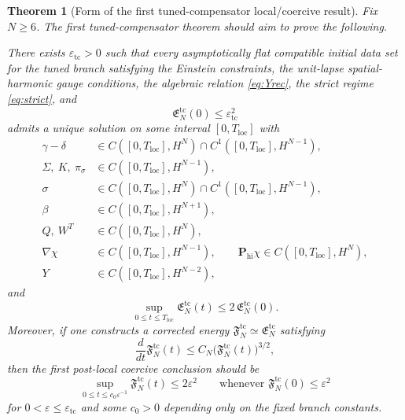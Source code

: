 \documentclass[11pt]{article}
\newtheorem{theorem}{Theorem}
\begin{document}
\begin{theorem}[Form of the first tuned-compensator local/coercive result]
\label{thm:form}
Fix \(N\ge 6\). The first tuned-compensator theorem should aim to prove the following.

There exists \(\varepsilon_{\mathrm{tc}}>0\) such that every asymptotically flat compatible initial data set for the tuned branch satisfying the Einstein constraints, the unit-lapse spatial-harmonic gauge conditions, the algebraic relation \eqref{eq:Yrec}, the strict regime \eqref{eq:strict}, and
\begin{equation}
\mathfrak E_N^{\mathrm{tc}}(0)\le \varepsilon_{\mathrm{tc}}^2
\label{eq:small}
\end{equation}
admits a unique solution on some interval \([0,T_{\mathrm{loc}}]\) with
\begin{align}
\gamma-\delta &\in C([0,T_{\mathrm{loc}}],H^N)\cap C^1([0,T_{\mathrm{loc}}],H^{N-1}),
\label{eq:reggamma}
\\
\Sigma,\ K,\ \pi_\sigma &\in C([0,T_{\mathrm{loc}}],H^{N-1}),
\label{eq:regsigmakpi}
\\
\sigma &\in C([0,T_{\mathrm{loc}}],H^N)\cap C^1([0,T_{\mathrm{loc}}],H^{N-1}),
\label{eq:regsigma}
\\
\beta &\in C([0,T_{\mathrm{loc}}],H^{N+1}),
\label{eq:regbeta}
\\
Q,\ W^T &\in C([0,T_{\mathrm{loc}}],H^N),
\label{eq:regaux}
\\
\nabla\chi &\in C([0,T_{\mathrm{loc}}],H^{N-1}),
\qquad
\mathbf P_{\mathrm{hi}}\chi\in C([0,T_{\mathrm{loc}}],H^N),
\label{eq:regchi}
\\
Y &\in C([0,T_{\mathrm{loc}}],H^{N-2}),
\label{eq:regY}
\end{align}
and
\begin{equation}
\sup_{0\le t\le T_{\mathrm{loc}}}\mathfrak E_N^{\mathrm{tc}}(t)
\le
2\,\mathfrak E_N^{\mathrm{tc}}(0).
\label{eq:localbound}
\end{equation}
Moreover, if one constructs a corrected energy \(\mathfrak F_N^{\mathrm{tc}}\simeq \mathfrak E_N^{\mathrm{tc}}\) satisfying
\begin{equation}
\frac{d}{dt}\mathfrak F_N^{\mathrm{tc}}(t)
\le
C_N\bigl(\mathfrak F_N^{\mathrm{tc}}(t)\bigr)^{3/2},
\label{eq:coerciveineq}
\end{equation}
then the first post-local coercive conclusion should be
\begin{equation}
\sup_{0\le t\le c_0\varepsilon^{-1}}\mathfrak F_N^{\mathrm{tc}}(t)
\le
2\varepsilon^2
\qquad
\text{whenever }
\mathfrak F_N^{\mathrm{tc}}(0)\le \varepsilon^2
\label{eq:coercivetarget}
\end{equation}
for \(0<\varepsilon\le \varepsilon_{\mathrm{tc}}\) and some \(c_0>0\) depending only on the fixed branch constants.
\end{theorem}
\end{document}
